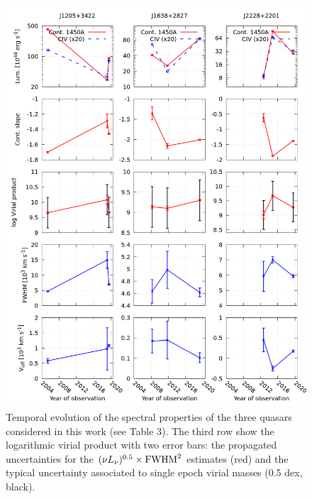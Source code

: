 \documentclass[fleqn,usenatbib]{mnras}
\begin{document}
\begin{figure}
  \centering
  \includegraphics[width=\textwidth]{figures/QSFit-results}
  \vspace{-12pt}
  \caption{
    Temporal evolution of the spectral properties of the three quasars
    considered in this work (see Table 3).  The third row show the
    logarithmic virial product with two error bars: the propagated
    uncertainties for the $(\nu L_{\nu})^{0.5} \times {\rm FWHM}^2$
    estimates (red) and the typical uncertainty associated to single epoch
    virial masses (0.5 dex, black).}
  \label{fig:QSFit-results}
\end{figure}
\end{document}
